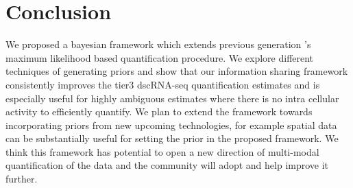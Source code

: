 \section{Conclusion}
We proposed a bayesian framework which extends previous generation \alevin 's maximum likelihood based 
quantification procedure. We explore different techniques of generating priors and show that our 
information sharing framework consistently improves the tier3 dscRNA-seq quantification estimates and 
is especially useful for highly ambiguous estimates where there is no intra cellular activity to 
efficiently quantify. We plan to extend the framework towards incorporating priors from new upcoming 
technologies, for example spatial data can be substantially useful for setting the prior in the proposed 
\alevin framework.  We think this framework has potential to open a new direction of multi-modal 
quantification of the data and the community will adopt and help improve it further.
